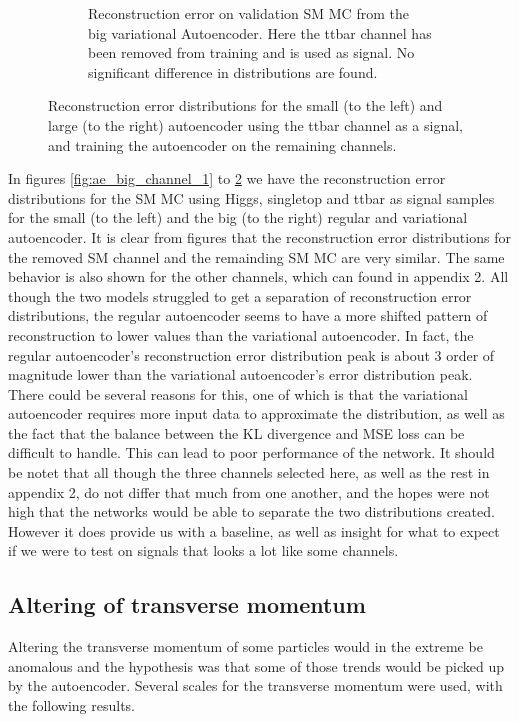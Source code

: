 \begin{figure}[h!]
\begin{subfigure}{.45\textwidth}
        \caption{Reconstruction error on validation SM MC from the big variational Autoencoder. Here the ttbar channel has been removed from training and 
        is used as signal. No significant difference in distributions are found. }
        \label{fig:vae_big_ttbar}
    \end{subfigure}
    \hfill 
    \caption[VAE | Reconstruction error using ttbar channel as signal]{Reconstruction error distributions for the small (to the left) and large (to the right) autoencoder using the ttbar channel as a signal, and 
    training the autoencoder on the remaining channels. }
    \label{fig:vae_big_channel_3}
\end{figure}

In figures \ref{fig:ae_big_channel_1} to \ref{fig:vae_big_channel_3} we have the reconstruction error distributions for the SM MC using 
Higgs, singletop and ttbar as signal samples for the small (to the left) and the big (to the right) regular and variational autoencoder. 
It is clear from figures that the reconstruction error distributions for the removed SM channel and the remainding SM MC are very similar. 
The same behavior is also shown for the other channels, which can found in appendix 2. All though the two models struggled to get a 
separation of reconstruction error distributions, the regular autoencoder seems to have a more shifted pattern of reconstruction to lower 
values than the variational autoencoder. In fact, the regular autoencoder's reconstruction error distribution peak is about 3 order of 
magnitude lower than the variational autoencoder's error distribution peak. There could be several reasons for this, one of which is that 
the variational autoencoder requires more input data to approximate the distribution, as well as the fact that the balance between the KL divergence and MSE loss 
can be difficult to handle\cite{kl_mse_balance}. This can lead to poor performance of the network. It should be notet that all though the 
three channels selected here, as well as the rest in appendix 2, do not differ that much from one another, and the hopes were not high that 
the networks would be able to separate the two distributions created. However it does provide us with a baseline, as well as insight for what 
to expect if we were to test on signals that looks a lot like some channels. 


\newpage


\subsection*{Altering of transverse momentum}
Altering the transverse momentum of some particles would in the extreme be anomalous and the hypothesis was that some of those trends would be
picked up by the autoencoder. Several scales for the transverse momentum were used, with the following results.


